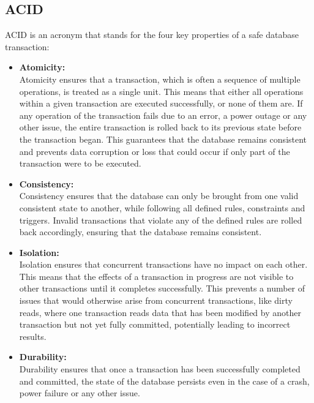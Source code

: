 \subsection{ACID}

ACID is an acronym that stands for the four key properties of a safe database transaction:

\begin{itemize}
    \item \textbf{Atomicity:} \\ 
    Atomicity ensures that a transaction, which is often a sequence of multiple operations, is treated as a single unit. This means that either all operations within a given transaction are executed successfully, or none of them are. If any operation of the transaction fails due to an error, a power outage or any other issue, the entire transaction is rolled back to its previous state before the transaction began. This guarantees that the database remains consistent and prevents data corruption or loss that could occur if only part of the transaction were to be executed.
    
    \item \textbf{Consistency:} \\
    Consistency ensures that the database can only be brought from one valid consistent state to another, while following all defined rules, constraints and triggers. Invalid transactions that violate any of the defined rules are rolled back accordingly, ensuring that the database remains consistent.
    
    \item \textbf{Isolation:} \\
    Isolation ensures that concurrent transactions have no impact on each other. This means that the effects of a transaction in progress are not visible to other transactions until it completes successfully. This prevents a number of issues that would otherwise arise from concurrent transactions, like dirty reads, where one transaction reads data that has been modified by another transaction but not yet fully committed, potentially leading to incorrect results.
    
    \item \textbf{Durability:} \\ 
    Durability ensures that once a transaction has been successfully completed and committed, the state of the database persists even in the case of a crash, power failure or any other issue. 
\end{itemize}

